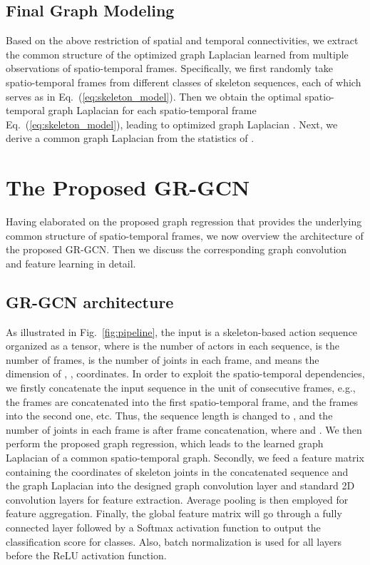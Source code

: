 \documentclass[conference]{IEEEtran}
\begin{document}
\subsection{Final Graph Modeling}
Based on the above restriction of spatial and temporal connectivities, we extract the common structure of the optimized graph Laplacian learned from multiple observations of spatio-temporal frames. Specifically, we first randomly take  spatio-temporal frames from different classes of skeleton sequences, each of which serves as  in Eq.~(\ref{eq:skeleton_model}). Then we obtain the optimal spatio-temporal graph Laplacian for each spatio-temporal frame Eq.~(\ref{eq:skeleton_model}), leading to  optimized graph Laplacian . Next, we derive a common graph Laplacian  from the statistics of .  



\section{The Proposed GR-GCN}
\label{sec:GR-GCN}
Having elaborated on the proposed graph regression that provides the underlying common structure of spatio-temporal frames, we now overview the architecture of the proposed GR-GCN. Then we discuss the corresponding graph convolution and feature learning in detail.

\subsection{GR-GCN architecture}

As illustrated in Fig.~\ref{fig:pipeline}, the input is a skeleton-based action sequence organized as a  tensor, where  is the number of actors in each sequence,  is the number of frames,  is the number of joints in each frame, and  means the dimension of , ,  coordinates. In order to exploit the spatio-temporal dependencies, we firstly concatenate the input sequence in the unit of  consecutive frames, e.g., the  frames are concatenated into the first spatio-temporal frame, and the  frames into the second one, etc. Thus, the sequence length is changed to , and the number of joints in each frame is  after frame concatenation, where  and . We then perform the proposed graph regression, which leads to the learned graph Laplacian of a common spatio-temporal graph. Secondly, we feed a feature matrix containing the coordinates of skeleton joints in the concatenated sequence and the graph Laplacian into the designed graph convolution layer and standard 2D convolution layers for feature extraction. Average pooling is then employed for feature aggregation. Finally, the global feature matrix will go through a fully connected layer followed by a Softmax activation function to output the classification score for  classes. Also, batch normalization is used for all layers before the ReLU activation function.
\end{document}
